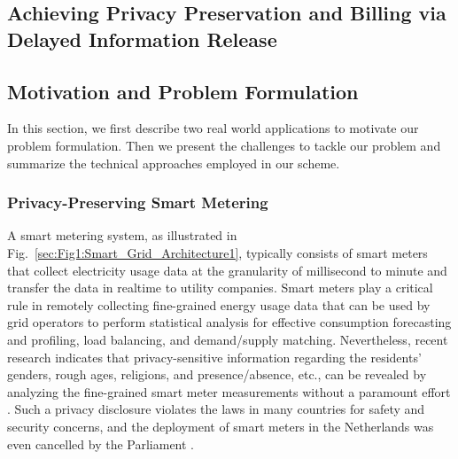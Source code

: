 \documentclass[letterpaper,12pt]{article}
\begin{document}
   \newpage
   \begin{singlespace}
   \section{Achieving Privacy Preservation and Billing via Delayed Information Release}
   \end{singlespace}

   \subsection{Motivation and Problem Formulation} \label{Sec:motivation:problem:formulation}

In this section, we first describe two real world applications to motivate our problem formulation. Then we present the challenges to tackle our problem and summarize the technical approaches employed in our scheme.

\subsubsection{Privacy-Preserving Smart Metering}


A smart metering system, as illustrated in Fig.~\ref{sec:Fig1:Smart_Grid_Architecture1},  typically consists of smart meters that collect electricity usage data at the granularity of millisecond to minute and transfer the data in realtime to utility companies. Smart meters play a critical rule in remotely collecting fine-grained energy usage data that can be used by grid operators to perform statistical analysis for effective consumption forecasting and profiling, load balancing, and demand/supply matching. Nevertheless, recent research \cite{anderson2010security,garcia2011privacy, bauer2009recognizing, hart1992nonintrusive, hart1989residential} indicates that privacy-sensitive information regarding the residents' genders, rough ages, religions, and presence/absence, etc., can be revealed by analyzing the fine-grained smart meter measurements without a paramount effort \cite{molina2010private}. Such a privacy disclosure violates the laws in many countries for safety and security concerns, and the deployment of smart meters in the Netherlands was even cancelled by the Parliament \cite{molina2010private}.
\end{document}
